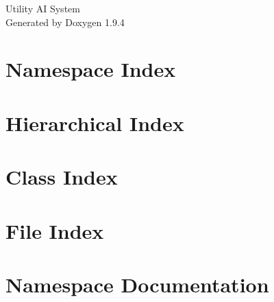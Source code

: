 \documentclass[twoside]{book}
\newcommand{\+}{\discretionary{\mbox{\scriptsize$\hookleftarrow$}}{}{}}
\newcommand{\clearemptydoublepage}{%
    \newpage{\pagestyle{empty}\cleardoublepage}%
  }
\begin{document}
  \raggedbottom
    \hypersetup{pageanchor=false,
                bookmarksnumbered=true,
                pdfencoding=unicode
               }
  \begin{titlepage}
  \vspace*{7cm}
  \begin{center}%
  {\Large Utility AI System}\\
  \vspace*{1cm}
  {\large Generated by Doxygen 1.9.4}\\
  \end{center}
  \end{titlepage}
  \clearemptydoublepage
  \tableofcontents
  \clearemptydoublepage
  \hypersetup{pageanchor=true}
\chapter{Namespace Index}

\chapter{Hierarchical Index}

\chapter{Class Index}

\chapter{File Index}

\chapter{Namespace Documentation}






























\end{document}
